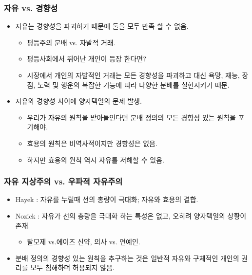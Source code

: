 \documentclass[aspectratio=169,xcolor=dvipsnames,handout]{beamer}
\begin{document}
\begin{frame}[<+->]
\frametitle{자유 vs. 경향성}
    \begin{itemize}
        \item 자유는 경향성을 파괴하기 때문에 둘을 모두 만족 할 수 없음.
        \begin{itemize}
            \item 평등주의 분배 vs. 자발적 거래.
            \item 평등사회에서 뛰어난 개인이 등장 한다면?
            \item 시장에서 개인의 자발적인 거래는 모든 경향성을 파괴하고 대신 욕망, 재능, 장점, 노력 및 행운의 복잡한 기능에 따라 다양한 분배를 실현시키기 때문.
        \end{itemize}
        \item 자유와 경향성 사이에 양자택일의 문제 발생.
        \begin{itemize}
            \item 우리가 자유의 원칙을 받아들인다면 분배 정의의 모든 경향성 있는 원칙을 포기해야.
            \item 효용의 원칙은 비역사적이지만 경향성은 없음.
            \item 하지만 효용의 원칙 역시 자유를 저해할 수 있음.
        \end{itemize}
    \end{itemize}
\end{frame}

\begin{frame}[<+->]
\frametitle{자유 지상주의 vs. 우파적 자유주의}
    \begin{itemize}
        \item Hayek : 자유를 누릴때 선의 총량이 극대화; 자유와 효용의 결합.
        \item Nozick : 자유가 선의 총량을 극대화 하는 특성은 없고, 오히려 양자택일의 상황이 존재.
        \begin{itemize}
            \item 탈모제 vs.에이즈 신약, 의사 vs. 연예인.
        \end{itemize}
        \item 분배 정의의 경향성 있는 원칙을 추구하는 것은 일반적 자유와 구체적인 개인의 권리를 모두 침해하며 허용되지 않음.
    \end{itemize}
\end{frame}
\end{document}
